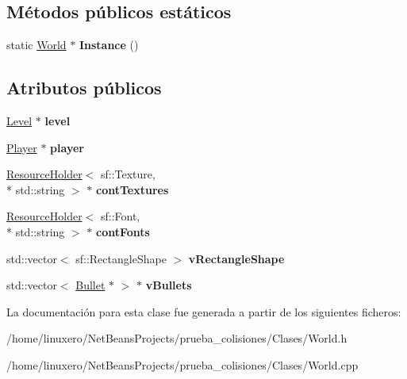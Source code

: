 \subsection*{Métodos públicos estáticos}
\begin{DoxyCompactItemize}
\item 
\hypertarget{classWorld_a1881ce92c156c24c864a8fd079be20c2}{static \hyperlink{classWorld}{World} $\ast$ {\bfseries Instance} ()}\label{classWorld_a1881ce92c156c24c864a8fd079be20c2}

\end{DoxyCompactItemize}
\subsection*{Atributos públicos}
\begin{DoxyCompactItemize}
\item 
\hypertarget{classWorld_afaed9604e36a6a5a562da7294af39be2}{\hyperlink{classLevel}{Level} $\ast$ {\bfseries level}}\label{classWorld_afaed9604e36a6a5a562da7294af39be2}

\item 
\hypertarget{classWorld_addf54f12f3a1e9c8f120265bafa3474e}{\hyperlink{classPlayer}{Player} $\ast$ {\bfseries player}}\label{classWorld_addf54f12f3a1e9c8f120265bafa3474e}

\item 
\hypertarget{classWorld_af6e54a7d400b0e589cfaad872af0f1b6}{\hyperlink{classResourceHolder}{Resource\-Holder}$<$ sf\-::\-Texture, \\*
std\-::string $>$ $\ast$ {\bfseries cont\-Textures}}\label{classWorld_af6e54a7d400b0e589cfaad872af0f1b6}

\item 
\hypertarget{classWorld_a2767a70043e32c81784b3deb96f0c8e5}{\hyperlink{classResourceHolder}{Resource\-Holder}$<$ sf\-::\-Font, \\*
std\-::string $>$ $\ast$ {\bfseries cont\-Fonts}}\label{classWorld_a2767a70043e32c81784b3deb96f0c8e5}

\item 
\hypertarget{classWorld_a7365975cf93c7a9b4868c53c4ac189a2}{std\-::vector$<$ sf\-::\-Rectangle\-Shape $>$ {\bfseries v\-Rectangle\-Shape}}\label{classWorld_a7365975cf93c7a9b4868c53c4ac189a2}

\item 
\hypertarget{classWorld_a7c5f3199bedf69881b6fc5957fc2d1f9}{std\-::vector$<$ \hyperlink{classBullet}{Bullet} $\ast$ $>$ $\ast$ {\bfseries v\-Bullets}}\label{classWorld_a7c5f3199bedf69881b6fc5957fc2d1f9}

\end{DoxyCompactItemize}


La documentación para esta clase fue generada a partir de los siguientes ficheros\-:\begin{DoxyCompactItemize}
\item 
/home/linuxero/\-Net\-Beans\-Projects/prueba\-\_\-colisiones/\-Clases/World.\-h\item 
/home/linuxero/\-Net\-Beans\-Projects/prueba\-\_\-colisiones/\-Clases/World.\-cpp\end{DoxyCompactItemize}
